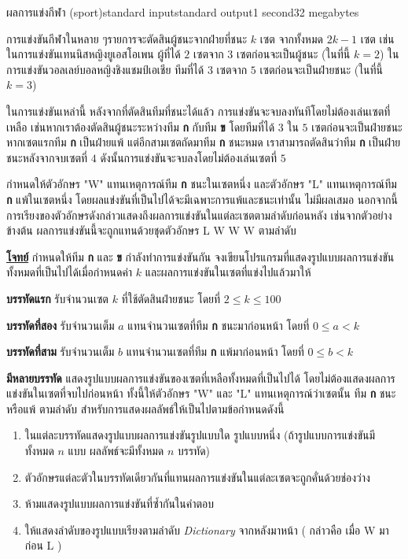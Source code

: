 \documentclass[11pt,a4paper]{article}
\begin{document}
\begin{problem}{ผลการแข่งกีฬา (sport)}{standard input}{standard output}{1 second}{32 megabytes}

การแข่งขันกีฬาในหลาย ๆรายการจะตัดสินผู้ชนะจากฝ่ายที่ชนะ $k$ เซต จากทั้งหมด $2k-1$ เซต เช่น ในการแข่งขันเทนนิสหญิงยูเอสโอเพน ผู้ที่ได้ $2$ เซตจาก $3$ เซตก่อนจะเป็นผู้ชนะ (ในที่นี้ $k=2$) ในการแข่งขันวอลเลย์บอลหญิงชิงแชมป์เอเชีย ทีมที่ได้ $3$ เซตจาก $5$ เซตก่อนจะเป็นฝ่ายชนะ (ในที่นี้ $k=3$)

          ในการแข่งขันเหล่านี้ หลังจากที่ตัดสินทีมที่ชนะได้แล้ว การแข่งขันจะจบลงทันทีโดยไม่ต้องเล่นเซตที่เหลือ เช่นหากเราต้องตัดสินผู้ชนะระหว่างทีม \textbf{ก} กับทีม \textbf{ข} โดยทีมที่ได้ $3$ ใน $5$ เซตก่อนจะเป็นฝ่ายชนะ หากเซตแรกทีม \textbf{ก} เป็นฝ่ายแพ้ แต่อีกสามเซตถัดมาทีม \textbf{ก} ชนะหมด เราสามารถตัดสินว่าทีม \textbf{ก} เป็นฝ่ายชนะหลังจากจบเซตที่ $4$ ดังนั้นการแข่งขันจะจบลงโดยไม่ต้องเล่นเซตที่ $5$

          กำหนดให้ตัวอักษร "W" แทนเหตุการณ์ทีม \textbf{ก} ชนะในเซตหนึ่ง และตัวอักษร "L" แทนเหตุการณ์ทีม \textbf{ก} แพ้ในเซตหนึ่ง โดยผลแข่งขันที่เป็นไปได้จะมีเฉพาะการแพ้และชนะเท่านั้น ไม่มีผลเสมอ นอกจากนี้การเรียงของตัวอักษรดังกล่าวแสดงถึงผลการแข่งขันในแต่ละเซตตามลำดับก่อนหลัง เช่นจากตัวอย่างข้างต้น ผลการแข่งขันนี้จะถูกแทนด้วยชุดตัวอักษร L W W W ตามลำดับ

          

\bigskip
\underline{\textbf{โจทย์}}  กำหนดให้ทีม \textbf{ก} และ \textbf{ข} กำลังทำการแข่งขันกัน จงเขียนโปรแกรมที่แสดงรูปแบบผลการแข่งขันทั้งหมดที่เป็นไปได้เมื่อกำหนดค่า $k$ และผลการแข่งขันในเซตที่แข่งไปแล้วมาให้


\InputFile

\textbf{บรรทัดแรก} รับจำนวนเซต $k$ ที่ใช้ตัดสินฝ่ายชนะ โดยที่ $2 \leq k \leq 100$

\textbf{บรรทัดที่สอง} รับจำนวนเต็ม $a$ แทนจำนวนเซตที่ทีม \textbf{ก} ชนะมาก่อนหน้า โดยที่  $0 \leq a < k$

\textbf{บรรทัดที่สาม} รับจำนวนเต็ม $b$ แทนจำนวนเซตที่ทีม \textbf{ก} แพ้มาก่อนหน้า โดยที่ $0 \leq b < k$


\OutputFile

\textbf{มีหลายบรรทัด} แสดงรูปแบบผลการแข่งขันของเซตที่เหลือทั้งหมดที่เป็นไปได้ โดยไม่ต้องแสดงผลการแข่งขันในเซตที่จบไปก่อนหน้า ทั้งนี้ให้ตัวอักษร "W" และ "L" แทนเหตุการณ์ว่าเซตนั้น ทีม \textbf{ก} ชนะหรือแพ้ ตามลำดับ สำหรับการแสดงผลลัพธ์ให้เป็นไปตามข้อกำหนดดังนี้

\begin{enumerate}

\item ในแต่ละบรรทัดแสดงรูปแบบผลการแข่งขันรูปแบบใด รูปแบบหนึ่ง (ถ้ารูปแบบการแข่งขันมีทั้งหมด $n$ แบบ ผลลัพธ์จะมีทั้งหมด $n$ บรรทัด)
\item ตัวอักษรแต่ละตัวในบรรทัดเดียวกันที่แทนผลการแข่งขันในแต่ละเซตจะถูกคั่นด้วยช่องว่าง
\item ห้ามแสดงรูปแบบผลการแข่งขันที่ซ้ำกันในคำตอบ
\item ให้แสดงลำดับของรูปแบบเรียงตามลำดับ \textit{Dictionary} จากหลังมาหน้า ( กล่าวคือ เมื่อ W มาก่อน L )
\end{enumerate}


\end{problem}
\end{document}
